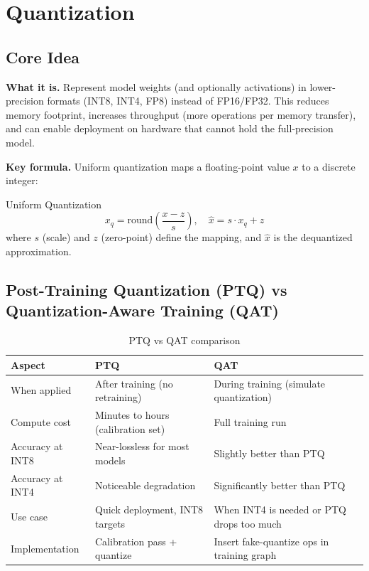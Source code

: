 \section{Quantization}
\label{sec:quantization}

\subsection{Core Idea}

\textbf{What it is.} Represent model weights (and optionally activations) in lower-precision formats (INT8, INT4, FP8) instead of FP16/FP32. This reduces memory footprint, increases throughput (more operations per memory transfer), and can enable deployment on hardware that cannot hold the full-precision model.

\textbf{Key formula.} Uniform quantization maps a floating-point value $x$ to a discrete integer:

\begin{mathresult}{Uniform Quantization}
\begin{equation}
x_q = \text{round}\!\left(\frac{x - z}{s}\right), \quad \hat{x} = s \cdot x_q + z
\end{equation}
where $s$ (scale) and $z$ (zero-point) define the mapping, and $\hat{x}$ is the dequantized approximation.
\end{mathresult}

\subsection{Post-Training Quantization (PTQ) vs Quantization-Aware Training (QAT)}

\begin{table}[H]
\centering
\caption{PTQ vs QAT comparison}
\begin{tabularx}{\textwidth}{lXX}
\toprule
\textbf{Aspect} & \textbf{PTQ} & \textbf{QAT} \\
\midrule
When applied & After training (no retraining) & During training (simulate quantization) \\
Compute cost & Minutes to hours (calibration set) & Full training run \\
Accuracy at INT8 & Near-lossless for most models & Slightly better than PTQ \\
Accuracy at INT4 & Noticeable degradation & Significantly better than PTQ \\
Use case & Quick deployment, INT8 targets & When INT4 is needed or PTQ drops too much \\
Implementation & Calibration pass + quantize & Insert fake-quantize ops in training graph \\
\bottomrule
\end{tabularx}
\end{table}

